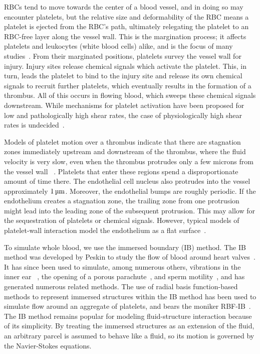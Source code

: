 RBCs tend to move towards the center of a blood vessel, and in doing so may encounter
platelets, but the relative size and deformability of the RBC means a platelet is ejected
from the RBC's path, ultimately relegating the platelet to an RBC-free layer along the
vessel wall. This is the margination process; it affects platelets and leukocytes (white
blood cells) alike, and is the focus of many studies~\cite{Freund:2007kx,Erickson:2010ep,
Erickson:2011cf,Zhao:2011do,Kumar:2011dd,Zhao:2012ggba,Fedosov:2012dy,Kumar:2012ie,
Fedosov:2013ul,Muller:2014is,Fedosov:2014bs, Vahidkhah:2014hy,Vahidkhah:2015ch,
Mehrabadi:2016fn}. From their marginated positions, platelets survey the vessel wall for
injury. Injury sites release chemical signals which activate the platelet. This, in turn,
leads the platelet to bind to the injury site and release its own chemical signals to
recruit further platelets, which eventually results in the formation of a thrombus. All
of this occurs in flowing blood, which sweeps these chemical signals downstream. While
mechanisms for platelet activation have been proposed for low and pathologically high
shear rates, the case of physiologically high shear rates is undecided~\cite{Fogelson:2015fb}.

Models of platelet motion over a thrombus indicate that there are stagnation zones
immediately upstream and downstream of the thrombus, where the fluid velocity is very
slow, even when the thrombus protrudes only a few microns from the vessel wall~%
\cite{Skorczewski:2013jn,Wang:2013gs}. Platelets that enter these regions spend a
disproportionate amount of time there. The endothelial cell nucleus also protrudes into
the vessel approximately $1\um$. Moreover, the endothelial bumps are roughly periodic. If
the endothelium creates a stagnation zone, the trailing zone from one protrusion might
lead into the leading zone of the subsequent protrusion. This may allow for the
sequestration of platelets or chemical signals. However, typical models of platelet-wall
interaction model the endothelium as a flat surface~\cite{Wu:2014gt,Vahidkhah:2015ch}.

To simulate whole blood, we use the immersed boundary (IB) method. The IB method was
developed by Peskin to study the flow of blood around heart valves~\cite{Peskin:1972wa}.
It has since been used to simulate, among numerous others, vibrations in the inner ear~%
\cite{BeyerJr:1990tb}, the opening of a porous parachute~\cite{Kim:2006ku}, and sperm
motility~\cite{Dillon:2011cu}, and has generated numerous related methods. The use of
radial basis function-based methods to represent immersed structures within the IB method
has been used to simulate flow around an aggregate of platelets, and bears the moniker
RBF-IB~\cite{Shankar:2015km}. The IB method remains popular for modeling fluid-structure
interaction because of its simplicity. By treating the immersed structures as an
extension of the fluid, an arbitrary parcel is assumed to behave like a fluid, so its
motion is governed by the Navier-Stokes equations.

